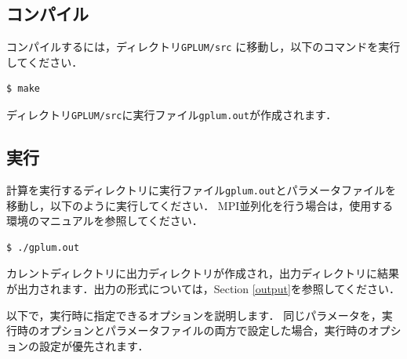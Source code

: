 \documentclass[12pt,a4paper,dvipdfmx]{jsarticle}
\newcommand{\ourcode}{GPLUM\xspace}
\begin{document}
\subsection{コンパイル\label{compile}}

コンパイルするには，ディレクトリ\texttt{\ourcode /src} に移動し，以下のコマンドを実行してください．
\begin{verbatim}
$ make
\end{verbatim}
ディレクトリ\texttt{\ourcode /src}に実行ファイル\texttt{gplum.out}が作成されます．



\subsection{実行}

計算を実行するディレクトリに実行ファイル\texttt{gplum.out}とパラメータファイルを移動し，以下のように実行してください．
MPI並列化を行う場合は，使用する環境のマニュアルを参照してください．
\begin{verbatim}
$ ./gplum.out
\end{verbatim}
カレントディレクトリに出力ディレクトリが作成され，出力ディレクトリに結果が出力されます．出力の形式については，Section \ref{output}を参照してください．

以下で，実行時に指定できるオプションを説明します．
同じパラメータを，実行時のオプションとパラメータファイルの両方で設定した場合，実行時のオプションの設定が優先されます．
\end{document}
